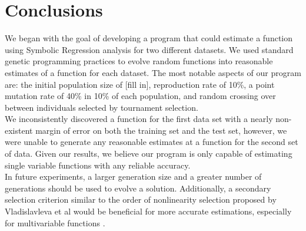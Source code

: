 
\section{Conclusions}
\label{sec:concl}

We began with the goal of developing a program that could estimate a
function using Symbolic Regression analysis for two different
datasets. We used standard genetic programming practices to evolve
random functions into reasonable estimates of a function for each
dataset. The most notable aspects of our program are: the initial
population size of [fill in], reproduction rate of 10\%, a point
mutation rate of 40\% in 10\% of each population, and random crossing
over between individuals selected by tournament selection.\\

We inconsistently discovered a function for the first data set with a
nearly non-existent margin of error on both the training set and the
test set, however, we were unable to generate any reasonable estimates
at a function for the second set of data. Given our results, we
believe our program is only capable of estimating single variable
functions with any reliable accuracy. \\

In future experiments, a larger generation size and a greater number of generations should be used to evolve a solution. Additionally, a secondary selection criterion similar to the order of nonlinearity selection proposed by Vladislavleva et al would be beneficial for more accurate estimations, especially for multivariable functions \cite{Vladislavleva:2009:ONC:1650356.1650365}. 
